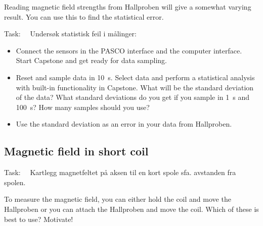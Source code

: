 \documentclass[../Elmag-labhefte-2020.tex]{subfiles}
\begin{document}
Reading magnetic field strengths from Hallproben will give a somewhat varying result. You can use this to find the statistical error.

Task: \ \
{\itsf Undersøk statistisk feil i målinger:}
\vspace{-5mm}
\begin{itemize}
    \item Connect the sensors in the PASCO interface and the computer interface. Start Capstone and get ready for data sampling.
    \item Reset and sample data in \SI{10}{\s}. Select data and perform a statistical analysis with built-in functionality in Capstone. What will be the standard deviation of the data? What standard deviations do you get if you sample in \SI{1}{\s} and \SI{100}{\s}? How many samples should you use?
    \item Use the standard deviation as an error in your data from Hallproben.
\end{itemize}

\subsection{Magnetic field in short coil}

Task: \ \
{\itsf Kartlegg magnetfeltet på aksen til en kort spole sfa. avstanden fra spolen.}
 

To measure the magnetic field, you can either hold the coil and move the Hallproben or you can attach the Hallproben and move the coil.
Which of these is best to use? Motivate!
\end{document}
